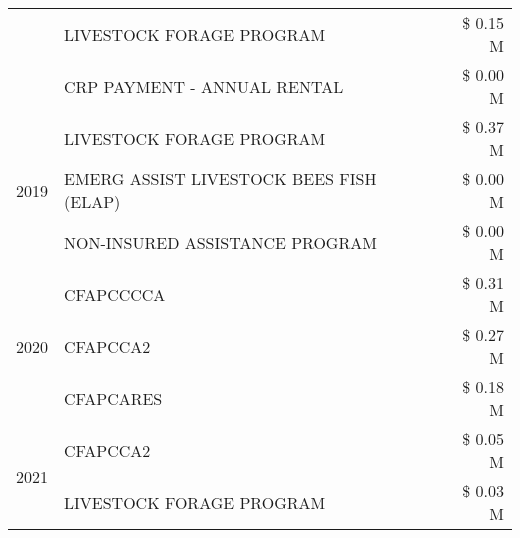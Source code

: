 \begin{tabular}{llr}
 & LIVESTOCK FORAGE PROGRAM & \$ 0.15 M \\
 & CRP PAYMENT - ANNUAL RENTAL & \$ 0.00 M \\
\cline{1-3}
\multirow[t]{3}{*}{2019} & LIVESTOCK FORAGE PROGRAM & \$ 0.37 M \\
 & EMERG ASSIST LIVESTOCK BEES FISH (ELAP) & \$ 0.00 M \\
 & NON-INSURED ASSISTANCE PROGRAM & \$ 0.00 M \\
\cline{1-3}
\multirow[t]{3}{*}{2020} & CFAPCCCCA & \$ 0.31 M \\
 & CFAPCCA2 & \$ 0.27 M \\
 & CFAPCARES & \$ 0.18 M \\
\cline{1-3}
\multirow[t]{2}{*}{2021} & CFAPCCA2 & \$ 0.05 M \\
 & LIVESTOCK FORAGE PROGRAM & \$ 0.03 M \\
\cline{1-3}
\bottomrule
\end{tabular}
